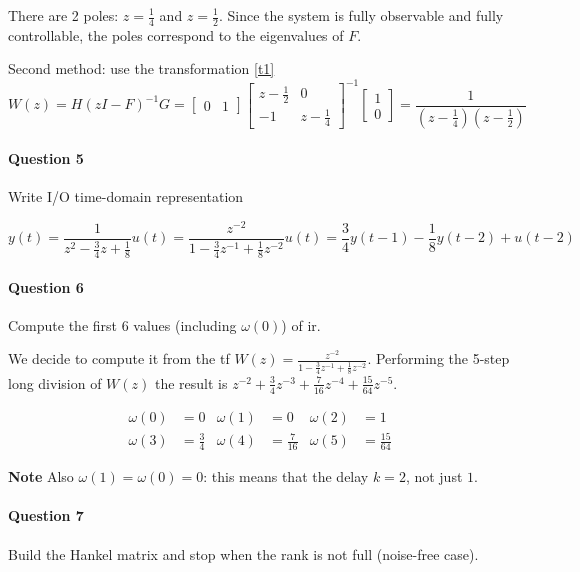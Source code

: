 \begin{example}
    There are 2 poles: $z=\frac{1}{4}$ and $z=\frac{1}{2}$. Since the system is fully observable and fully controllable, the poles correspond to the eigenvalues of $F$.

    Second method: use the transformation \ref{t1}
    \[
        W(z) = H(zI-F)^{-1}G = \begin{bmatrix}
            0 & 1
        \end{bmatrix} \begin{bmatrix}
            z-\frac{1}{2} & 0 \\
            -1 & z-\frac{1}{4}
        \end{bmatrix}^{-1} \begin{bmatrix}
            1 \\ 0
        \end{bmatrix} = \frac{1}{(z-\frac{1}{4})(z-\frac{1}{2})}
    \]

    \paragraph{Question 5} Write I/O time-domain representation

    \[
        y(t) = \frac{1}{z^2-\frac{3}{4}z+\frac{1}{8}}u(t) = \frac{z^{-2}}{1-\frac{3}{4}z^{-1}+\frac{1}{8}z^{-2}}u(t) = \frac{3}{4}y(t-1) - \frac{1}{8}y(t-2) + u(t-2)
    \]

    \paragraph{Question 6} Compute the first 6 values (including $\omega(0)$) of \gls{ir}.

    We decide to compute it from the \gls{tf} $W(z) = \frac{z^{-2}}{1-\frac{3}{4}z^{-1}+\frac{1}{8}z^{-2}}$.
    Performing the 5-step long division of $W(z)$ the result is $z^{-2}+\frac{3}{4}z^{-3}+\frac{7}{16}z^{-4}+\frac{15}{64}z^{-5}$.

    \begin{align*}
        \omega(0) &= 0 &
        \omega(1) &= 0 &
        \omega(2) &= 1 \\
        \omega(3) &= \frac{3}{4} &
        \omega(4) &= \frac{7}{16} &
        \omega(5) &= \frac{15}{64}
    \end{align*}

    \textbf{Note} Also $\omega(1)=\omega(0)=0$: this means that the delay $k=2$, not just $1$.
    
    \paragraph{Question 7} Build the Hankel matrix and stop when the rank is not full (noise-free case).


\end{example}
